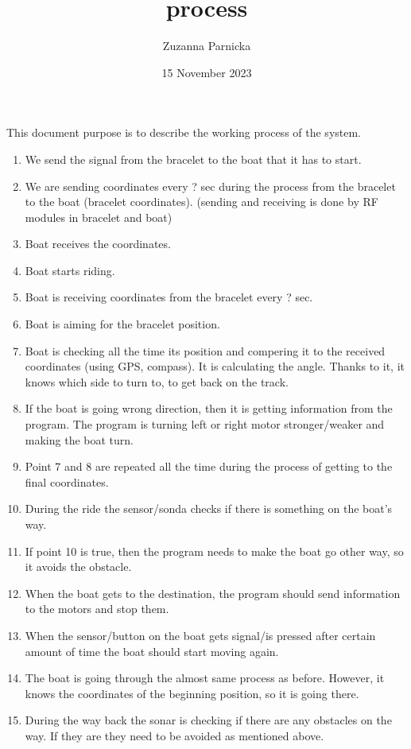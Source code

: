 \documentclass{article}[10pt]
\title{process}
\author{Zuzanna Parnicka}
\date{15 November 2023}
\begin{document}
\maketitle

This document purpose is to describe the working process of the system.\\
\begin{enumerate}
    \item We send the signal from the bracelet to the boat that it has to start.
    \item We are sending coordinates every ? sec during the process from the bracelet to the boat (bracelet coordinates). (sending and receiving is done by RF modules in bracelet and boat)
    \item Boat receives the coordinates.
    \item Boat starts riding.
    \item Boat is receiving coordinates from the bracelet every ? sec.
    \item Boat is aiming for the bracelet position.
    \item Boat is checking all the time its position and compering it to the received coordinates (using GPS, compass). It is calculating the angle. Thanks to it, it knows which side to turn to, to get back on the track.
    \item If the boat is going wrong direction, then it is getting information from the program. The program is turning left or right motor stronger/weaker and making the boat turn. 
    \item Point 7 and 8 are repeated all the time during the process of getting to the final coordinates.
    \item During the ride the sensor/sonda checks if there is something on the boat’s way.
    \item If point 10 is true, then the program needs to make the boat go other way, so it avoids the obstacle.
    \item When the boat gets to the destination, the program should send information to the motors and stop them.
    \item When the sensor/button on the boat gets signal/is pressed after certain amount of time the boat should start moving again.
    \item The boat is going through the almost same process as before. However, it knows the coordinates of the beginning position, so it is going there. 
    \item During the way back the sonar is checking if there are any obstacles on the way. If they are they need to be avoided as mentioned above.
    
\end{enumerate}
\end{document}
